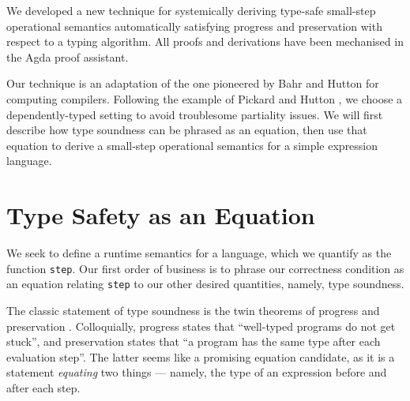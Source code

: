\documentclass[manuscript,screen,review,sigplan]{acmart}
\begin{document}


We developed a new technique for systemically deriving type-safe
small-step operational semantics automatically satisfying progress and
preservation with respect to a typing algorithm. All proofs and
derivations have been mechanised in the Agda proof assistant.

Our technique is an adaptation of the one pioneered by Bahr and Hutton
\cite{bahr:2015} for computing compilers. Following the example of
Pickard and Hutton \cite{pickard:2021}, we choose a dependently-typed
setting to avoid troublesome partiality issues. We will first describe
how type soundness can be phrased as an equation, then use that equation
to derive a small-step operational semantics for a simple expression
language.

\section{Type Safety as an Equation}

We seek to define a runtime semantics for a language, which we quantify as
the function \texttt{step}.  Our first order of business is to phrase our
correctness condition as an equation relating \texttt{step} to our other
desired quantities, namely, type soundness.

The classic statement of type soundness is the twin theorems of
progress and preservation \cite{harper:pfpl}. Colloquially, progress states
that ``well-typed programs do not get stuck'', and preservation states that
``a program has the same type after each evaluation step''. The latter seems
like a promising equation candidate, as it is a statement \emph{equating} two
things --- namely, the type of an expression before and after each step.
\end{document}
